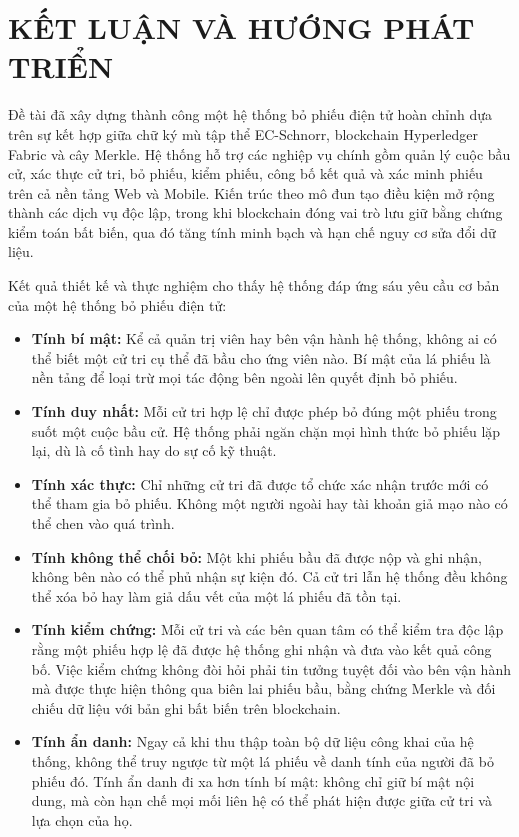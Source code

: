 \section*{KẾT LUẬN VÀ HƯỚNG PHÁT TRIỂN}
{}

Đề tài đã xây dựng thành công một hệ thống bỏ phiếu điện tử hoàn chỉnh dựa trên sự kết hợp giữa chữ ký mù tập thể EC-Schnorr, blockchain Hyperledger Fabric và cây Merkle. Hệ thống hỗ trợ các nghiệp vụ chính gồm quản lý cuộc bầu cử, xác thực cử tri, bỏ phiếu, kiểm phiếu, công bố kết quả và xác minh phiếu trên cả nền tảng Web và Mobile. Kiến trúc theo mô đun tạo điều kiện mở rộng thành các dịch vụ độc lập, trong khi blockchain đóng vai trò lưu giữ bằng chứng kiểm toán bất biến, qua đó tăng tính minh bạch và hạn chế nguy cơ sửa đổi dữ liệu.

Kết quả thiết kế và thực nghiệm cho thấy hệ thống đáp ứng sáu yêu cầu cơ bản của một hệ thống bỏ phiếu điện tử:

\begin{itemize}
    \item \textbf{Tính bí mật:} Kể cả quản trị viên hay bên vận hành hệ thống, không ai có thể biết một cử tri cụ thể đã bầu cho ứng viên nào. Bí mật của lá phiếu là nền tảng để loại trừ mọi tác động bên ngoài lên quyết định bỏ phiếu.

    \item \textbf{Tính duy nhất:} Mỗi cử tri hợp lệ chỉ được phép bỏ đúng một phiếu trong suốt một cuộc bầu cử. Hệ thống phải ngăn chặn mọi hình thức bỏ phiếu lặp lại, dù là cố tình hay do sự cố kỹ thuật.

    \item \textbf{Tính xác thực:} Chỉ những cử tri đã được tổ chức xác nhận trước mới có thể tham gia bỏ phiếu. Không một người ngoài hay tài khoản giả mạo nào có thể chen vào quá trình.

    \item \textbf{Tính không thể chối bỏ:} Một khi phiếu bầu đã được nộp và ghi nhận, không bên nào có thể phủ nhận sự kiện đó. Cả cử tri lẫn hệ thống đều không thể xóa bỏ hay làm giả dấu vết của một lá phiếu đã tồn tại.

    \item \textbf{Tính kiểm chứng:} Mỗi cử tri và các bên quan tâm có thể kiểm tra độc lập rằng một phiếu hợp lệ đã được hệ thống ghi nhận và đưa vào kết quả công bố. Việc kiểm chứng không đòi hỏi phải tin tưởng tuyệt đối vào bên vận hành mà được thực hiện thông qua biên lai phiếu bầu, bằng chứng Merkle và đối chiếu dữ liệu với bản ghi bất biến trên blockchain.

    \item \textbf{Tính ẩn danh:} Ngay cả khi thu thập toàn bộ dữ liệu công khai của hệ thống, không thể truy ngược từ một lá phiếu về danh tính của người đã bỏ phiếu đó. Tính ẩn danh đi xa hơn tính bí mật: không chỉ giữ bí mật nội dung, mà còn hạn chế mọi mối liên hệ có thể phát hiện được giữa cử tri và lựa chọn của họ.
\end{itemize}

